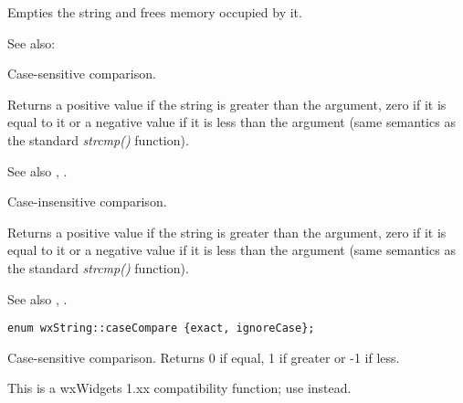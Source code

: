 \label{wxstringclear}


Empties the string and frees memory occupied by it.

See also: 


\label{wxstringcmp}



Case-sensitive comparison.

Returns a positive value if the string is greater than the argument, zero if
it is equal to it or a negative value if it is less than the argument (same semantics
as the standard {\it strcmp()} function).

See also , .


\label{wxstringcmpnocase}



Case-insensitive comparison.

Returns a positive value if the string is greater than the argument, zero if
it is equal to it or a negative value if it is less than the argument (same semantics
as the standard {\it strcmp()} function).

See also , .


\label{wxstringcompareto}

\begin{verbatim}
enum wxString::caseCompare {exact, ignoreCase};
\end{verbatim}


Case-sensitive comparison. Returns 0 if equal, 1 if greater or -1 if less.

This is a wxWidgets 1.xx compatibility function; use  instead.


\label{wxstringcontains}



